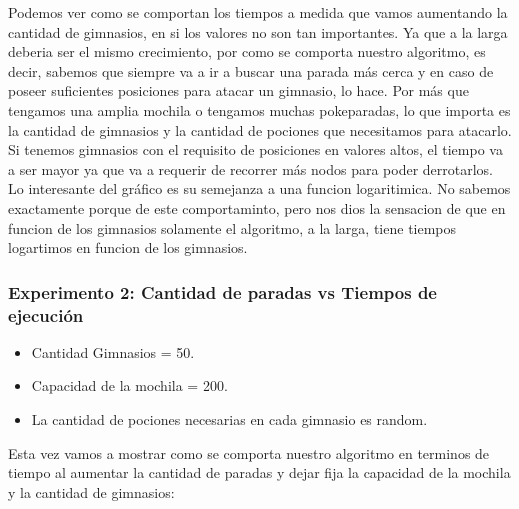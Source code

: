 Podemos ver como se comportan los tiempos a medida que vamos aumentando la cantidad de gimnasios, en si los valores no son tan importantes.
Ya que a la larga deberia ser el mismo crecimiento, por como se comporta nuestro algoritmo, es decir, sabemos que siempre va a ir a buscar una parada más cerca y
en caso de poseer suficientes posiciones para atacar un gimnasio, lo hace. Por más que tengamos una amplia mochila o tengamos muchas pokeparadas, lo que importa es la cantidad de gimnasios y
la cantidad de pociones que necesitamos para atacarlo. Si tenemos gimnasios con el requisito de posiciones en valores altos, el tiempo va a ser mayor ya que va a requerir de recorrer más nodos para poder derrotarlos.
Lo interesante del gráfico es su semejanza a una funcion logaritimica. No sabemos exactamente porque de este comportaminto, pero nos dios la 
sensacion de que en funcion de los gimnasios solamente el algoritmo, a la larga, tiene tiempos logartimos en funcion de los gimnasios.


\subsubsection{Experimento 2: Cantidad de paradas vs Tiempos de ejecución}

\begin{itemize}
\item Cantidad Gimnasios = 50.
\item Capacidad de la mochila = 200.
\item La cantidad de pociones necesarias en cada gimnasio es random.
\end{itemize}

Esta vez vamos a mostrar como se comporta nuestro algoritmo en terminos de tiempo al aumentar la cantidad de paradas y dejar fija la capacidad de la mochila y la cantidad de gimnasios:

